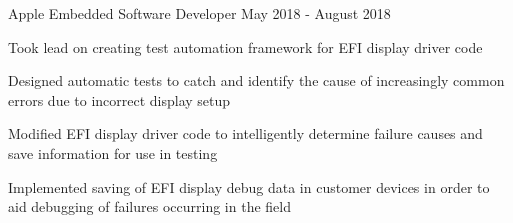 \begin{cventries}
  \cventry
    {Apple} %
    {Embedded Software Developer} %
    {May 2018 - August 2018} %
    {}
    {
      \begin{cvitems} %
        \item {Took lead on creating test automation framework for EFI display driver code}
        \item {Designed automatic tests to catch and identify the cause of increasingly common errors due to incorrect display setup}
        \item {Modified EFI display driver code to intelligently determine failure causes and save information for use in testing}
        \item {Implemented saving of EFI display debug data in customer devices in order to aid debugging of failures occurring in the field}
      \end{cvitems}
    }


\end{cventries}
